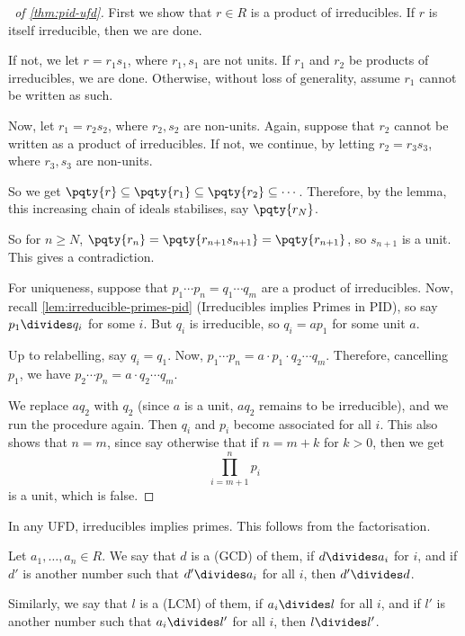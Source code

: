 \begin{proof}[\proofname\ of \autoref{thm:pid-ufd}]
    First we show that \(r \in R\) is a product of irreducibles. If \(r\) is itself irreducible, then we are done.

    If not, we let \(r = r_1 s_1\), where \(r_1, s_1\) are not units. If \(r_1\) and \(r_2\) be products of irreducibles, we are done. Otherwise, without loss of generality, assume \(r_1\) cannot be written as such.

    Now, let \(r_1 = r_2 s_2\), where \(r_2, s_2\) are non-units. Again, suppose that \(r_2\) cannot be written as a product of irreducibles. If not, we continue, by letting \(r_2 = r_3 s_3\), where \(r_3, s_3\) are non-units.

    So we get \(\pqty{r} \subseteq \pqty{r_1} \subseteq \pqty{r_2} \subseteq \cdots\). Therefore, by the lemma, this increasing chain of ideals stabilises, say \(\pqty{r_N}\).

    So for \(n \geq N\), \(\pqty{r_n} = \pqty{r_{n + 1} s_{n + 1}} = \pqty{r_{n + 1}}\), so \(s_{n + 1}\) is a unit. This gives a contradiction.

    For uniqueness, suppose that \(p_1 \cdots p_n = q_1 \cdots q_m\) are a product of irreducibles. Now, recall \autoref{lem:irreducible-primes-pid} (Irreducibles implies Primes in PID), so say \(p_1 \divides q_i\) for some \(i\). But \(q_i\) is irreducible, so \(q_i = a p_1\) for some unit \(a\).

    Up to relabelling, say \(q_i = q_1\). Now, \(p_1 \cdots p_n = a \cdot p_1 \cdot q_2 \cdots q_m\). Therefore, cancelling \(p_1\), we have \(p_2 \cdots p_n = a \cdot q_2 \cdots q_m\).

    We replace \(a q_2\) with \(q_2\) (since \(a\) is a unit, \(a q_2\) remains to be irreducible), and we run the procedure again. Then \(q_i\) and \(p_i\) become associated for all \(i\). This also shows that \(n = m\), since say otherwise that if \(n = m + k\) for \(k > 0\), then we get
    \[
        \prod_{i = m + 1}^{n} p_i
    \]
    is a unit, which is false.
\end{proof}

\begin{remark}
    In any UFD, irreducibles implies primes. This follows from the factorisation.
\end{remark}

\begin{definition}
    \label{def:gcd-lcm}%
    Let \(a_1, \ldots, a_n \in R\). We say that \(d\) is a  (GCD) of them, if \(d \divides a_i\) for \(i\), and if \(d'\) is another number such that \(d' \divides a_i\) for all \(i\), then \(d' \divides d\).

    Similarly, we say that \(l\) is a  (LCM) of them, if \(a_i \divides l\) for all \(i\), and if \(l'\) is another number such that \(a_i \divides l'\) for all \(i\), then \(l \divides l'\).
\end{definition}

